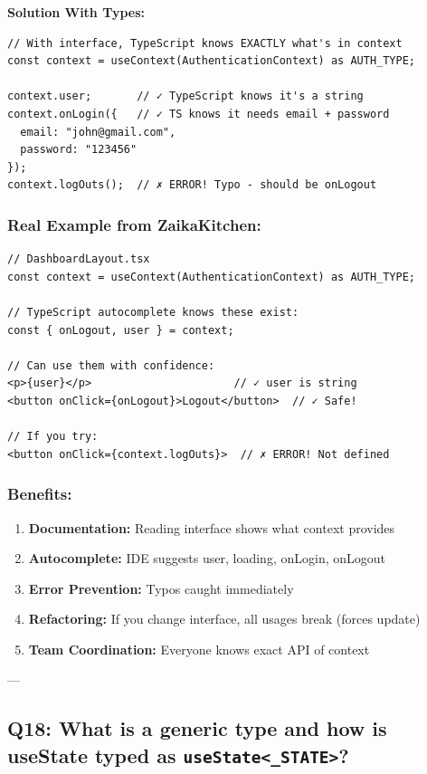 \documentclass[12pt]{article}
\begin{document}
\textbf{Solution With Types:}

\begin{lstlisting}
// With interface, TypeScript knows EXACTLY what's in context
const context = useContext(AuthenticationContext) as AUTH_TYPE;

context.user;       // ✓ TypeScript knows it's a string
context.onLogin({   // ✓ TS knows it needs email + password
  email: "john@gmail.com",
  password: "123456"
});
context.logOuts();  // ✗ ERROR! Typo - should be onLogout
\end{lstlisting}

\subsubsection*{Real Example from ZaikaKitchen:}

\begin{lstlisting}
// DashboardLayout.tsx
const context = useContext(AuthenticationContext) as AUTH_TYPE;

// TypeScript autocomplete knows these exist:
const { onLogout, user } = context;

// Can use them with confidence:
<p>{user}</p>                      // ✓ user is string
<button onClick={onLogout}>Logout</button>  // ✓ Safe!

// If you try:
<button onClick={context.logOuts}>  // ✗ ERROR! Not defined
\end{lstlisting}

\subsubsection*{Benefits:}

\begin{enumerate}
    \item \textbf{Documentation:} Reading interface shows what context provides
    \item \textbf{Autocomplete:} IDE suggests user, loading, onLogin, onLogout
    \item \textbf{Error Prevention:} Typos caught immediately
    \item \textbf{Refactoring:} If you change interface, all usages break (forces update)
    \item \textbf{Team Coordination:} Everyone knows exact API of context
\end{enumerate}

---

\subsection{Q18: What is a generic type and how is useState typed as \texttt{useState<\_STATE>}?}
\end{document}
